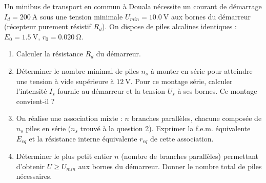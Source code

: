 \documentclass[11pt]{article}
\begin{document}
\begin{exercice}
Un minibus de transport en commun à Douala nécessite un courant de démarrage $I_d = \SI{200}{\ampere}$ sous une tension minimale $U_{min} = \SI{10,0}{\volt}$ aux bornes du démarreur (récepteur purement résistif $R_d$). On dispose de piles alcalines identiques : $E_0 = \SI{1,5}{\volt}$, $r_0 = \SI{0,020}{\ohm}$.
\begin{enumerate}
    \item Calculer la résistance $R_d$ du démarreur.
    \item Déterminer le nombre minimal de piles $n_s$ à monter en série pour atteindre une tension à vide supérieure à $\SI{12}{\volt}$. Pour ce montage série, calculer l'intensité $I_s$ fournie au démarreur et la tension $U_s$ à ses bornes. Ce montage convient-il ?
    \item On réalise une association mixte : $n$ branches parallèles, chacune composée de $n_s$ piles en série ($n_s$ trouvé à la question 2). Exprimer la f.e.m. équivalente $E_{eq}$ et la résistance interne équivalente $r_{eq}$ de cette association.
    \item Déterminer le plus petit entier $n$ (nombre de branches parallèles) permettant d'obtenir $U \ge U_{min}$ aux bornes du démarreur. Donner le nombre total de piles nécessaires.
\end{enumerate}
\end{exercice}
\end{document}
